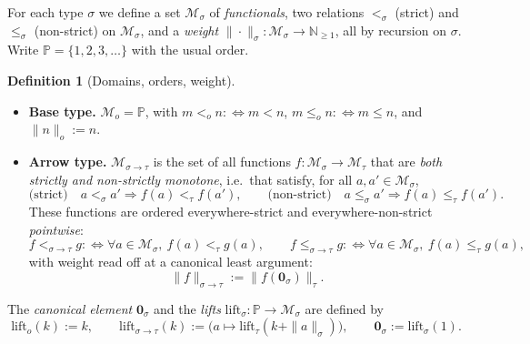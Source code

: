 \documentclass{amsart}
\theoremstyle{definition}
\newtheorem{definition}{Definition}
\begin{document}
For each type $\sigma$ we define a set $\mathcal M_\sigma$ of \emph{functionals}, two
relations $<_\sigma$ (strict) and $\le_\sigma$ (non-strict) on $\mathcal M_\sigma$, and
a \emph{weight} $\|\cdot\|_\sigma:\mathcal M_\sigma\to\mathbb N_{\ge 1}$, all by
recursion on $\sigma$. Write $\mathbb P=\{1,2,3,\dots\}$ with the usual order.

\begin{definition}[Domains, orders, weight]\label{def:dom}
\leavevmode
\begin{itemize}
\item \textbf{Base type.}
  $\mathcal M_o=\mathbb P$, with $m<_o n :\Leftrightarrow m<n$,
  $m\le_o n:\Leftrightarrow m\le n$, and $\|n\|_o:=n$.
\item \textbf{Arrow type.}
  $\mathcal M_{\sigma\to\tau}$ is the set of all functions
  $f:\mathcal M_\sigma\to\mathcal M_\tau$ that are \emph{both strictly and non-strictly
  monotone}, i.e.\ that satisfy, for all $a,a'\in\mathcal M_\sigma$,
  \[
    \text{(strict)}\quad a<_\sigma a' \Rightarrow f(a)<_\tau f(a'),
    \qquad
    \text{(non-strict)}\quad a\le_\sigma a' \Rightarrow f(a)\le_\tau f(a').
  \]
  These functions are ordered everywhere-strict and everywhere-non-strict
  \emph{pointwise}:
  \[
    f<_{\sigma\to\tau}g :\Leftrightarrow
    \forall a\in\mathcal M_\sigma,\ f(a)<_\tau g(a),
    \qquad
    f\le_{\sigma\to\tau}g :\Leftrightarrow
    \forall a\in\mathcal M_\sigma,\ f(a)\le_\tau g(a),
  \]
  with weight read off at a canonical least argument:
  \[
    \|f\|_{\sigma\to\tau}:=\|f(\mathbf 0_\sigma)\|_\tau .
  \]
\end{itemize}
The \emph{canonical element} $\mathbf 0_\sigma$ and the \emph{lifts}
$\mathrm{lift}_\sigma:\mathbb P\to\mathcal M_\sigma$ are defined by
\[
  \mathrm{lift}_o(k):=k,\qquad
  \mathrm{lift}_{\sigma\to\tau}(k):=\bigl(a\mapsto\mathrm{lift}_\tau(k+\|a\|_\sigma)\bigr),
  \qquad \mathbf 0_\sigma:=\mathrm{lift}_\sigma(1).
\]
\end{definition}
\end{document}
